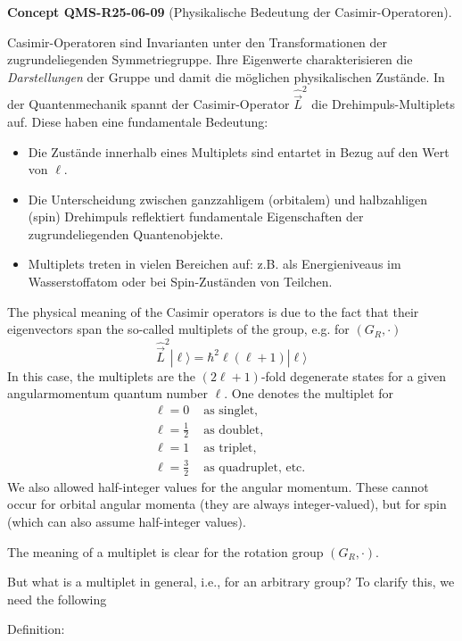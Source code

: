 \documentclass[10pt, letterpaper]{article}
\newcommand{\CustomHeading}[3]{%
  \par\medskip\noindent%
  \textbf{#1 #2} \textnormal{(#3)}.\enskip%
}
\newenvironment{CONC}[2]{\begin{unitbox}\CustomHeading{Concept}{#1}{#2}}{\end{unitbox}}
\begin{document}
\begin{CONC}{QMS-R25-06-09}{Physikalische Bedeutung der Casimir-Operatoren}
Casimir-Operatoren sind Invarianten unter den Transformationen der zugrundeliegenden Symmetriegruppe. Ihre Eigenwerte charakterisieren die \textit{Darstellungen} der Gruppe und damit die möglichen physikalischen Zustände. In der Quantenmechanik spannt der Casimir-Operator $\hat{\vec{L}}^2$ die Drehimpuls-Multiplets auf. Diese haben eine fundamentale Bedeutung:
\begin{itemize}
  \item Die Zustände innerhalb eines Multiplets sind entartet in Bezug auf den Wert von $\ell$.
  \item Die Unterscheidung zwischen ganzzahligem (orbitalem) und halbzahligen (spin) Drehimpuls reflektiert fundamentale Eigenschaften der zugrundeliegenden Quantenobjekte.
  \item Multiplets treten in vielen Bereichen auf: z.B. als Energieniveaus im Wasserstoffatom oder bei Spin-Zuständen von Teilchen.
\end{itemize}
\end{CONC}




The physical meaning of the Casimir operators is due to the fact that their eigenvectors span the so-called multiplets of the group, e.g. for $\left(G_{R}, \cdot\right)$
$$
\hat{\vec{L}}^{2}|\ell\rangle=\hbar^{2} \ell(\ell+1)|\ell\rangle
$$
In this case, the multiplets are the $(2 \ell+1)$-fold degenerate states for a given angularmomentum quantum number $\ell$. One denotes the multiplet for
$$
\begin{array}{ll}
\ell=0 & \text { as singlet, } \\
\ell=\frac{1}{2} & \text { as doublet, } \\
\ell=1 & \text { as triplet, } \\
\ell=\frac{3}{2} & \text { as quadruplet, etc. }
\end{array}
$$
We also allowed half-integer values for the angular momentum. These cannot occur for orbital angular momenta (they are always integer-valued), but for spin (which can also assume half-integer values).


The meaning of a multiplet is clear for the rotation group $\left(G_{R}, \cdot\right)$. 


But what is a multiplet in general, i.e., for an arbitrary group? To clarify this, we need the following


Definition: 
\end{document}
